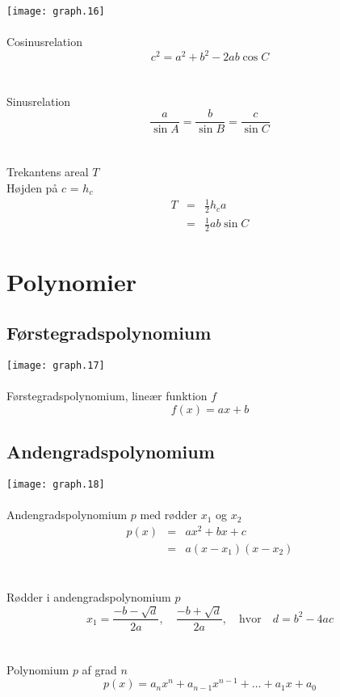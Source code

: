 \documentclass[11pt,a5paper,fleqn,leqno]{book}
\begin{document}
\texttt{[image: graph.16]}
\\
\\
Cosinusrelation
\begin{equation}
c^2 = a^2 + b^2 - 2ab\cos C
\end{equation}
\\
\\
Sinusrelation
\begin{equation}
\frac{a}{\sin A} = \frac{b}{\sin B} = \frac{c}{\sin C}
\end{equation}
\\
\\
Trekantens areal $T$ \\
Højden på $c$ = $h_c$
\begin{eqnarray}
T & = & \frac{1}{2}h_c a \\
& = & \frac{1}{2}ab\sin C \nonumber
\end{eqnarray}

\newpage

\section{Polynomier}

\subsection{Førstegradspolynomium}

\texttt{[image: graph.17]}
\\
\\
Førstegradspolynomium, lineær funktion $f$
\begin{equation}
f(x) = ax+b
\end{equation}

\newpage

\subsection{Andengradspolynomium}

\texttt{[image: graph.18]}
\\
\\
Andengradspolynomium $p$ med rødder $x_1$ og $x_2$
\begin{eqnarray}
p(x) & = & ax^2 + bx + c \\
 & = & a(x-x_1)(x-x_2) \nonumber
\end{eqnarray}
\\
\\
Rødder i andengradspolynomium $p$
\begin{equation}
x_1 = \frac{-b - \sqrt{d}}{2a}, \quad \frac{-b + \sqrt{d}}{2a}, \quad \text{hvor} \quad d = b^2 - 4ac
\end{equation}
\\
\\
Polynomium $p$ af grad $n$
\begin{equation}
p(x) = a_nx^n + a_{n-1}x^{n-1} + \dots + a_1x + a_0
\end{equation}
\end{document}
